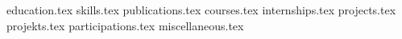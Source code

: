 \documentclass[11pt, a4paper]{awesome-cv}
\newcommand*{\sectiondir}{resume/}
\begin{document}
\makecvheader

{education.tex}
{skills.tex}
{publications.tex}
{courses.tex}
{internships.tex}
{projects.tex}
{projekts.tex}
{participations.tex}
{miscellaneous.tex}
\end{document}
